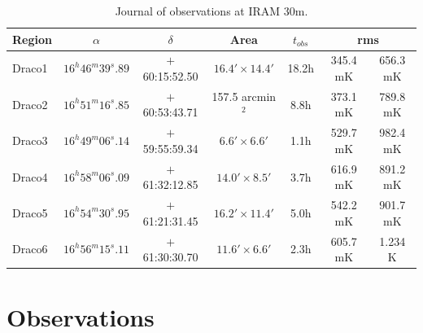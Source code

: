 \documentclass[traditabstract]{aa}
\newcommand{\tfm}[1]{\tablefootmark{#1}}
\begin{document}
\begin{table}[h]
  \centering
  \footnotesize
  \caption{\label{table:rms} Journal of observations at IRAM 30m.}
  \begin{tabular}{lcccccc}
    \hline \hline
    Region &      $\alpha$       &    $\delta$    &        Area         & $t_{obs}$ \tfm{a} & \multicolumn{2}{c}{rms \tfm{b}} \\ \hline 
    Draco1 & $16^h 46^m 39^s.89$ & $+$60:15:52.50 & $16.4'\times 14.4'$ &       18.2h       &    345.4 mK    &    656.3 mK    \\
    Draco2 & $16^h 51^m 16^s.85$ & $+$60:53:43.71 &  157.5 arcmin$^2$   &        8.8h       &    373.1 mK    &    789.8 mK    \\
    Draco3 & $16^h 49^m 06^s.14$ & $+$59:55:59.34 &  $6.6'\times 6.6'$  &        1.1h       &    529.7 mK    &    982.4 mK    \\
    Draco4 & $16^h 58^m 06^s.09$ & $+$61:32:12.85 & $14.0'\times 8.5'$  &        3.7h       &    616.9 mK    &    891.2 mK    \\
    Draco5 & $16^h 54^m 30^s.95$ & $+$61:21:31.45 & $16.2'\times 11.4'$ &        5.0h       &    542.2 mK    &    901.7 mK    \\
    Draco6 & $16^h 56^m 15^s.11$ & $+$61:30:30.70 & $11.6'\times 6.6'$  &        2.3h       &    605.7 mK    &    1.234 K     \\ \hline
  \end{tabular}
\end{table}

\section{Observations}
\label{sec:Obs}
\end{document}
